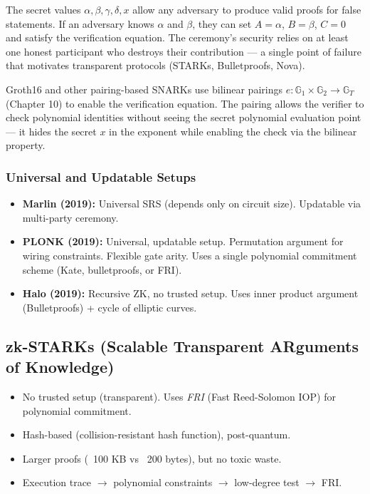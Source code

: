 The secret values $\alpha, \beta, \gamma, \delta, x$ allow any adversary to produce valid proofs for false statements. If an adversary knows $\alpha$ and $\beta$, they can set $A = \alpha$, $B = \beta$, $C=0$ and satisfy the verification equation. The ceremony's security relies on at least one honest participant who destroys their contribution --- a single point of failure that motivates transparent protocols (STARKs, Bulletproofs, Nova).

Groth16 and other pairing-based SNARKs use bilinear pairings $e: \mathbb{G}_1 \times \mathbb{G}_2 \to \mathbb{G}_T$ (Chapter 10) to enable the verification equation. The pairing allows the verifier to check polynomial identities without seeing the secret polynomial evaluation point --- it hides the secret $x$ in the exponent while enabling the check via the bilinear property.

\subsubsection*{Universal and Updatable Setups}

\begin{itemize}
\item \textbf{Marlin (2019):} Universal SRS (depends only on circuit size). Updatable via multi-party ceremony.
\item \textbf{PLONK (2019):} Universal, updatable setup. Permutation argument for wiring constraints. Flexible gate arity. Uses a single polynomial commitment scheme (Kate, bulletproofs, or FRI).
\item \textbf{Halo (2019):} Recursive ZK, no trusted setup. Uses inner product argument (Bulletproofs) + cycle of elliptic curves.
\end{itemize}

\subsection{zk-STARKs (Scalable Transparent ARguments of Knowledge)}
\label{sec:zk:stark}

\begin{itemize}
\item No trusted setup (transparent). Uses \emph{FRI} (Fast Reed-Solomon IOP) for polynomial commitment.
\item Hash-based (collision-resistant hash function), post-quantum.
\item Larger proofs (~100 KB vs ~200 bytes), but no toxic waste.
\item Execution trace $\to$ polynomial constraints $\to$ low-degree test $\to$ FRI.
\end{itemize}


